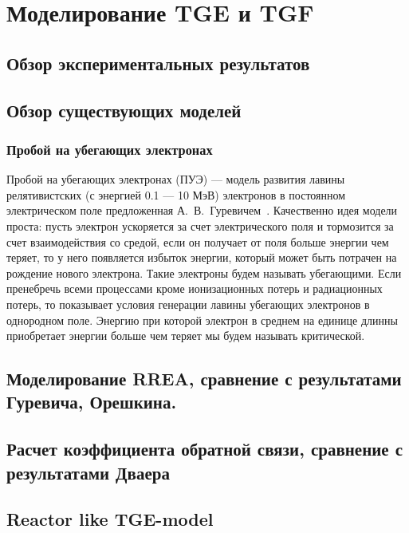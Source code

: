 \chapter{Моделирование TGE и TGF
}\label{ch:thunderstorm}

\section{Обзор экспериментальных результатов
}\label{sec:thunderstorm/review-exp}

\section{Обзор существующих моделей}\label{sec:thunderstorm/review-mod}

\subsection{Пробой на убегающих электронах}
%
Пробой на убегающих электронах (ПУЭ) --- модель развития лавины релятивистских (с энергией 0.1 --- 10 МэВ) электронов в постоянном электрическом поле предложенная А.~В.~Гуревичем~\cite{gurevich1992runaway,Gurevich2001ufn}. Качественно идея модели проста: пусть электрон ускоряется за счет электрического поля и тормозится за счет взаимодействия со средой, если он получает от поля больше энергии чем теряет, то у него появляется избыток энергии, который может быть потрачен на рождение нового электрона. Такие электроны будем называть убегающими. Если пренебречь всеми процессами кроме ионизационных потерь и радиационных потерь, то  показывает условия генерации лавины убегающих электронов в однородном поле. Энергию при которой электрон в среднем на единице длинны приобретает энергии больше чем теряет мы будем называть критической.


\section{Моделирование RREA, сравнение с результатами Гуревича, Орешкина.}\label{sec:thunderstorm/rrea}
\section{Расчет коэффициента обратной связи, сравнение с результатами Дваера}\label{sec:thunderstorm/rdfm}
\section{Reactor like TGE-model}\label{sec:thunderstorm/reactor}

